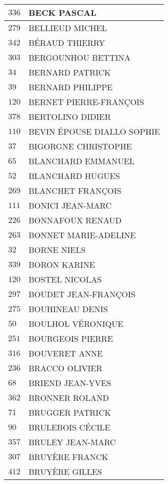\begin{xltabular}{\linewidth}{|l|X|}
    \hline
    $336$ & BECK PASCAL \\
    \hline
    $279$ & BELLIEUD MICHEL \\
    \hline
    $342$ & BÉRAUD THIERRY \\
    \hline
    $303$ & BERGOUNHOU BETTINA \\
    \hline
    $34$ & BERNARD PATRICK \\
    \hline
    $39$ & BERNARD PHILIPPE \\
    \hline
    $120$ & BERNET PIERRE-FRANÇOIS \\
    \hline
    $378$ & BERTOLINO DIDIER \\
    \hline
    $110$ & BEVIN ÉPOUSE DIALLO SOPHIE \\
    \hline
    $37$ & BIGORGNE CHRISTOPHE \\
    \hline
    $65$ & BLANCHARD EMMANUEL \\
    \hline
    $52$ & BLANCHARD HUGUES \\
    \hline
    $269$ & BLANCHET FRANÇOIS \\
    \hline
    $111$ & BONICI JEAN-MARC \\
    \hline
    $226$ & BONNAFOUX RENAUD \\
    \hline
    $263$ & BONNET MARIE-ADELINE \\
    \hline
    $32$ & BORNE NIELS \\
    \hline
    $339$ & BORON KARINE \\
    \hline
    $120$ & BOSTEL NICOLAS \\
    \hline
    $297$ & BOUDET JEAN-FRANÇOIS \\
    \hline
    $275$ & BOUHINEAU DENIS \\
    \hline
    $50$ & BOULHOL VÉRONIQUE \\
    \hline
    $251$ & BOURGEOIS PIERRE \\
    \hline
    $316$ & BOUVERET ANNE \\
    \hline
    $236$ & BRACCO OLIVIER \\
    \hline
    $68$ & BRIEND JEAN-YVES \\
    \hline
    $362$ & BRONNER ROLAND \\
    \hline
    $71$ & BRUGGER PATRICK \\
    \hline
    $90$ & BRULEBOIS CÉCILE \\
    \hline
    $357$ & BRULEY JEAN-MARC \\
    \hline
    $307$ & BRUYÈRE FRANCK \\
    \hline
    $412$ & BRUYÈRE GILLES \\

\end{xltabular}
